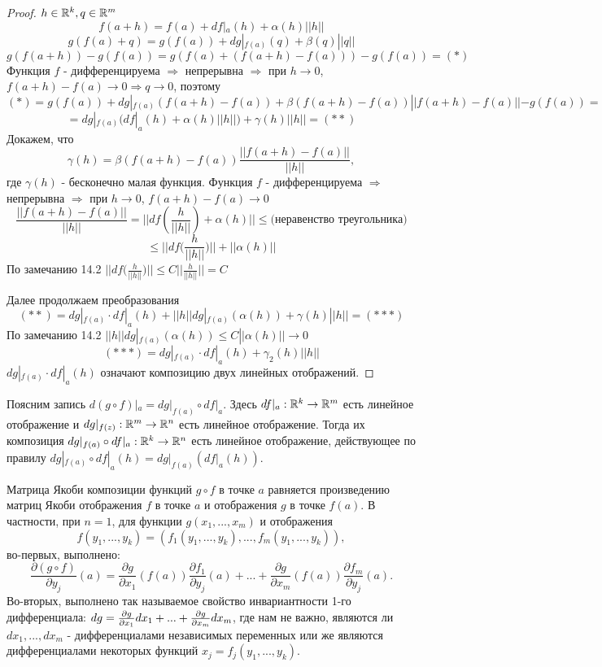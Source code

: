     \begin{proof}
    	$h \in \mathbb R^k, q \in \mathbb R^m$
    	\[ f(a + h) = f(a) + df|_a(h) + \alpha(h) ||h|| \]
    	\[ g(f(a) + q) = g(f(a)) + dg|_{f(a)}(q) + \beta(q)||q|| \]
    	\[ g(f(a + h)) - g(f(a)) = g(f(a) + (f(a + h) - f(a))) - g(f(a)) = (*) \]
    	Функция $f$ - дифференцируема $\Rightarrow$ непрерывна $\Rightarrow$ при $h \to 0$, $f(a + h) - f(a) \to 0 \Rightarrow q \to 0$, поэтому
    	\[ (*) = g(f(a)) + dg|_{f(a)}(f(a + h) - f(a)) + \beta(f(a + h) - f(a))||f(a + h) - f(a)|| - g(f(a)) = \]
    	\[ = dg|_{f(a)}(df|_a(h) + \alpha(h)||h||) + \gamma(h)||h|| = (**) \]
    	Докажем, что 
    	\[ \gamma(h) = \beta(f(a + h) - f(a))\frac{||f(a + h) - f(a)||}{||h||}, \]
    	где $\gamma(h)$ - бесконечно малая функция.
    	Функция $f$ - дифференцируема $\Rightarrow$ непрерывна $\Rightarrow$ при $h \to 0$, $f(a + h) - f(a) \to 0$
    	\[ \frac{||f(a + h) - f(a)||}{||h||} = ||df(\frac{h}{||h||}) + \alpha(h)|| \leqslant \text{(неравенство треугольника)} \]
    	\[ \leqslant ||df\bigg(\frac{h}{||h||}\bigg)|| + ||\alpha(h)|| \]
    	По замечанию 14.2 $||df\big(\frac{h}{||h||}\big)|| \leqslant C||\frac{h}{||h||}|| = C$
    	
    	Далее продолжаем преобразования
    	\[ (**) = dg|_{f(a)} \cdot df|_a{(h)} + ||h||dg|_{f(a)}(\alpha(h)) + \gamma(h)||h|| = (***) \]
    	По замечанию 14.2 $||h||dg|_{f(a)}(\alpha(h)) \leqslant C||\alpha(h)|| \to 0$
    	\[ (***) = dg|_{f(a)} \cdot df|_a{(h)} + \gamma_2(h)||h|| \]
    	$dg|_{f(a)} \cdot df|_a{(h)}$ означают композицию двух линейных отображений.
    \end{proof}
    
    \begin{mention}
    	Поясним запись $d(g \circ f)|_a = dg|_{f(a)} \circ df|_a$. Здесь $df|_a : \mathbb R^k \rightarrow \mathbb R^m$ есть линейное отображение и $dg|_{f(z)} : \mathbb R^m \rightarrow \mathbb R^n$ есть линейное отображение. Тогда их композиция $dg|_{f(a)} \circ df|_a : \mathbb R^k \rightarrow \mathbb R^n$ есть линейное отображение, действующее по правилу $dg|_{f(a)} \circ df|_a (h) = dg|_{f(a)} (df|_a (h))$.
    \end{mention}
    
    \begin{mention}
    	Матрица Якоби композиции функций $g \circ f$ в точке $a$ равняется произведению матриц Якоби отображения $f$ в точке $a$ и отображения $g$ в точке $f(a)$. В частности, при $n = 1$, для функции $g(x_1, ..., x_m)$ и отображения
    	\[ f(y_1, ..., y_k) = (f_1(y_1, ..., y_k), ..., f_m(y_1, ..., y_k)), \]
    	во-первых, выполнено:
    	\[ \frac{\partial (g \circ f)}{\partial y_j}(a) = \frac{\partial g}{\partial x_1}(f(a)) \frac{\partial f_1}{\partial y_j}(a) + ... + \frac{\partial g}{\partial x_m}(f(a)) \frac{\partial f_m}{\partial y_j}(a). \]
    	Во-вторых, выполнено так называемое свойство инвариантности 1-го дифференциала: $dg = \pdv{g}{x_1}dx_1 + ... + \pdv{g}{x_m}dx_m$, где нам не важно, являются ли $dx_1, ..., dx_m$ - дифференциалами независимых переменных или же являются дифференциалами некоторых функций $x_j = f_j(y_1, ..., y_k)$.
    \end{mention}
    
